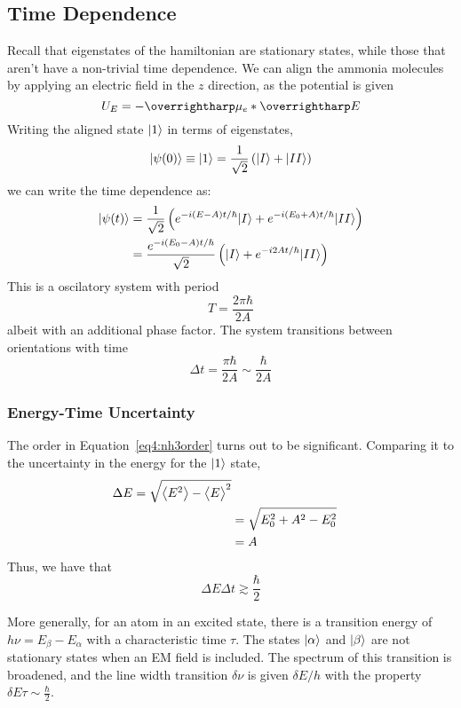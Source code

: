 \subsection{Time Dependence}
Recall that eigenstates of the hamiltonian are stationary states, while those that aren't have a non-trivial time dependence. We can align the ammonia molecules by applying an electric field in the \(z\) direction, as the potential is given 
\[U_E=-\vv{\mu}_e*\vv{E}\]
Writing the aligned state \(\lvert1\rangle\) in terms of eigenstates,
\begin{equation}
	\lvert\psi(0)\rangle\equiv\lvert1\rangle=\frac{1}{\sqrt{2}}\left(\lvert I\rangle+\lvert II\rangle\right)
\end{equation}
we can write the time dependence as:
\begin{align}
	\lvert\psi(t)\rangle&=\frac{1}{\sqrt{2}}\left(e^{-i(E-A)t/\hbar}\lvert I\rangle + e^{-i(E_0+A)t/\hbar}\lvert II\rangle\right)\nonumber\\
		 &=\frac{e^{-i(E_0-A)t/\hbar}}{\sqrt{2}}\left(\lvert I\rangle+e^{-i2At/\hbar}\lvert II\rangle\right)
\end{align}
This is a oscilatory system with period
\begin{equation}
	T=\frac{2\pi\hbar}{2A}
\end{equation}
albeit with an additional phase factor. The system transitions between orientations with time
\begin{equation}
	\Delta t = \frac{\pi\hbar}{2A}\sim\frac{\hbar}{2A}\label{eq4:nh3order}
\end{equation}
\subsubsection{Energy-Time Uncertainty}
The order in Equation~\ref{eq4:nh3order} turns out to be significant. Comparing it to the uncertainty in the energy for the \(\lvert1\rangle\) state,
\begin{align}
	\Delta E = \sqrt{\left\langle \begin{matrix}E^2\end{matrix} \right\rangle-\left\langle \begin{matrix}E\end{matrix} \right\rangle^2}\nonumber\\
	&=\sqrt{E_0^2+A^2-E_0^2}\nonumber\\
	&=A
\end{align}
Thus, we have that
\begin{equation}
	\Delta E \Delta t \gtrsim \frac{\hbar}{2}
\end{equation}

More generally, for an atom in an excited state, there is a transition energy of \(h\nu = E_\beta-E_\alpha\) with a characteristic time \(\tau\). The states \(\lvert\alpha\rangle\) and \(\lvert\beta\rangle\) are not stationary states when an EM field is included. The spectrum of this transition is broadened, and the line width transition \(\delta \nu\) is given \(\delta E / h\) with the property \(\delta E \tau \sim \frac{\hbar}{2}\).

